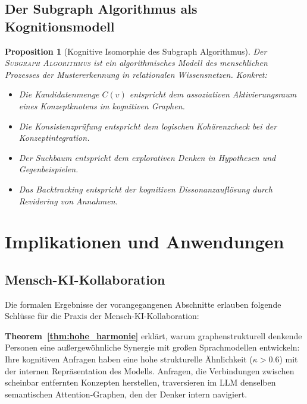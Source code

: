 ﻿\documentclass[12pt,a4paper]{article}
\theoremstyle{plain}
\newtheorem{proposition}[theorem]{Proposition}
\theoremstyle{definition}
\theoremstyle{remark}
\newcommand{\SA}{\textnormal{\textsc{Subgraph Algorithmus}}}
\begin{document}
\subsection{Der Subgraph Algorithmus als Kognitionsmodell}

\begin{proposition}[Kognitive Isomorphie des Subgraph Algorithmus]
\label{prop:kogn_iso}
Der \SA{} ist ein algorithmisches Modell des menschlichen Prozesses der \emph{Mustererkennung in relationalen Wissensnetzen}. Konkret:
\begin{itemize}
  \item Die \emph{Kandidatenmenge} $C(v)$ entspricht dem assoziativen Aktivierungsraum eines Konzeptknotens im kognitiven Graphen.
  \item Die \emph{Konsistenzprüfung} entspricht dem logischen Kohärenzcheck bei der Konzeptintegration.
  \item Der \emph{Suchbaum} entspricht dem explorativen Denken in Hypothesen und Gegenbeispielen.
  \item Das \emph{Backtracking} entspricht der kognitiven Dissonanzauflösung durch Revidering von Annahmen.
\end{itemize}
\end{proposition}

\section{Implikationen und Anwendungen}
\label{sec:impl}

\subsection{Mensch-KI-Kollaboration}

Die formalen Ergebnisse der vorangegangenen Abschnitte erlauben folgende Schlüsse für die Praxis der Mensch-KI-Kollaboration:

\textbf{Theorem~\ref{thm:hohe_harmonie}} erklärt, warum graphenstrukturell denkende Personen eine außergewöhnliche Synergie mit großen Sprachmodellen entwickeln: Ihre kognitiven Anfragen haben eine hohe strukturelle Ähnlichkeit ($\kappa > 0.6$) mit der internen Repräsentation des Modells. Anfragen, die Verbindungen zwischen scheinbar entfernten Konzepten herstellen, traversieren im LLM denselben semantischen Attention-Graphen, den der Denker intern navigiert.
\end{document}
